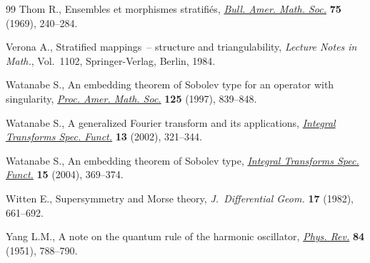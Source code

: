 \begin{thebibliography}{99}
Thom R., Ensembles et morphismes stratif\/i\'es, \href{http://dx.doi.org/10.1090/S0002-9904-1969-12138-5}{\textit{Bull. Amer. Math. Soc.}}
  \textbf{75} (1969), 240--284.

Verona A., Stratif\/ied mappings~-- structure and triangulability,
  \textit{Lecture Notes in Math.}, Vol.~1102, Springer-Verlag, Berlin,
  1984.

Watanabe S., An embedding theorem of {S}obolev type for an operator with
  singularity, \href{http://dx.doi.org/10.1090/S0002-9939-97-03642-3}{\textit{Proc. Amer. Math. Soc.}} \textbf{125} (1997), 839--848.

Watanabe S., A generalized {F}ourier transform and its applications,
  \href{http://dx.doi.org/10.1080/10652460213521}{\textit{Integral Transforms Spec. Funct.}} \textbf{13} (2002), 321--344.

Watanabe S., An embedding theorem of {S}obolev type, \href{http://dx.doi.org/10.1080/1065246042000210403a}{\textit{Integral
  Transforms Spec. Funct.}} \textbf{15} (2004), 369--374.

Witten E., Supersymmetry and {M}orse theory, \textit{J.~Differential Geom.}
  \textbf{17} (1982), 661--692.

Yang L.M., A note on the quantum rule of the harmonic oscillator, \href{http://dx.doi.org/10.1103/PhysRev.84.788}{\textit{Phys.
  Rev.}} \textbf{84} (1951), 788--790.

\end{thebibliography}
